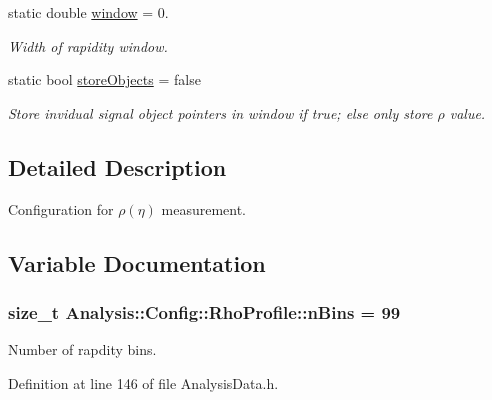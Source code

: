 \begin{DoxyCompactItemize}
static double \hyperlink{namespaceAnalysis_1_1Config_1_1RhoProfile_a0d0b2059ea054c907e9ef66dd1bc3604}{window} = 0.
\begin{DoxyCompactList}\small\item\em Width of rapidity window. \end{DoxyCompactList}\item 
static bool \hyperlink{namespaceAnalysis_1_1Config_1_1RhoProfile_af8222f6942cc30594db578bb98a39b3b}{store\+Objects} = false
\begin{DoxyCompactList}\small\item\em Store invidual signal object pointers in window if {\ttfamily true}; else only store $ \rho $ value. \end{DoxyCompactList}\end{DoxyCompactItemize}


\subsection{Detailed Description}
Configuration for $ \rho(\eta) $ measurement. 

\subsection{Variable Documentation}
\subsubsection[{\texorpdfstring{n\+Bins}{nBins}}]{\setlength{\rightskip}{0pt plus 5cm}size\+\_\+t Analysis\+::\+Config\+::\+Rho\+Profile\+::n\+Bins = 99\hspace{0.3cm}{\ttfamily [static]}}\hypertarget{namespaceAnalysis_1_1Config_1_1RhoProfile_aed9bc5e8b5b6b35cf2eb5462c04c4221}{}\label{namespaceAnalysis_1_1Config_1_1RhoProfile_aed9bc5e8b5b6b35cf2eb5462c04c4221}


Number of rapdity bins. 



Definition at line 146 of file Analysis\+Data.\+h.

